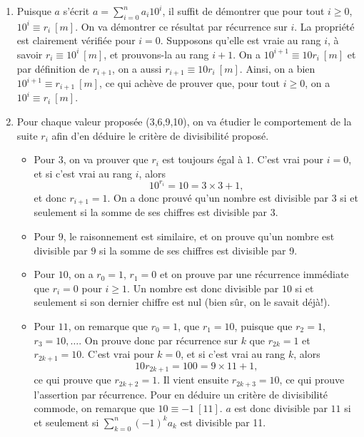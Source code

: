 \documentclass[11pt,a4paper]{article}
\begin{document}
	\begin{corrige}
		\begin{enumerate}
			
			\item  Puisque $a$ s'écrit $a=\sum_{i=0}^n a_i 10^i$, il suffit de démontrer que pour 
			tout $i\geq 0$, $10^i\equiv r_i\ [m]$. On va démontrer ce résultat par récurrence sur $i$.
			La propriété est clairement vérifiée pour $i=0$. Supposons qu'elle est vraie au rang $i$,
			à savoir $r_i\equiv 10^i\ [m]$, et prouvons-la au rang $i+1$. On a 
			$10^{i+1}\equiv 10r_i\ [m]$ et par définition de $r_{i+1}$, on a aussi $r_{i+1}\equiv 10r_i\ [m]$.
			Ainsi, on a bien $10^{i+1}\equiv r_{i+1}\ [m]$, ce qui achève de prouver que, pour tout $i\geq 0$, on a
			$10^i\equiv r_i\ [m]$.
			
			\item  Pour chaque valeur proposée (3,6,9,10), on va étudier le comportement de la suite $r_i$ afin d'en déduire
			le critère de divisibilité proposé.
			
			\begin{itemize}
				
				\item  Pour $3$, on va prouver que $r_i$ est toujours égal à $1$. C'est vrai pour $i=0$, et si c'est vrai au rang $i$, alors
				$$10^{r_i}=10=3\times 3+1,$$
				et donc $r_{i+1}=1$. On a donc prouvé qu'un nombre est divisible par $3$ si et seulement si la somme de ses chiffres est divisible par 3.
				
				\item  Pour $9$, le raisonnement est similaire, et on prouve qu'un nombre est divisible par $9$ si la somme de ses chiffres est divisible par 9.
				
				\item  Pour $10$, on a $r_0=1$, $r_1=0$ et on prouve par une récurrence immédiate que $r_i=0$ pour $i\geq 1$. Un nombre est donc divisible par $10$ si et seulement si
				son dernier chiffre est nul (bien sûr, on le savait déjà!).
				
				\item  Pour $11$, on remarque que $r_0=1$, que $r_1=10$, puisque que $r_2=1$, $r_3=10,\dots$. On prouve donc par récurrence sur $k$ que
				$r_{2k}=1$ et $r_{2k+1}=10$. C'est vrai pour $k=0$, et si c'est vrai au rang $k$, alors
				$$10r_{2k+1}=100=9\times 11+1,$$
				ce qui prouve que $r_{2k+2}=1$. Il vient ensuite $r_{2k+3}=10$, ce qui prouve l'assertion par récurrence. Pour en déduire un critère
				de divisibilité commode, on remarque que $10\equiv -1\ [11]$. $a$ est donc divisible par $11$ si et seulement si
				$\sum_{k=0}^n (-1)^k a_k$ est divisible par 11.
				
			\end{itemize}
			
			
		\end{enumerate}
	\end{corrige}
	
\end{document}
